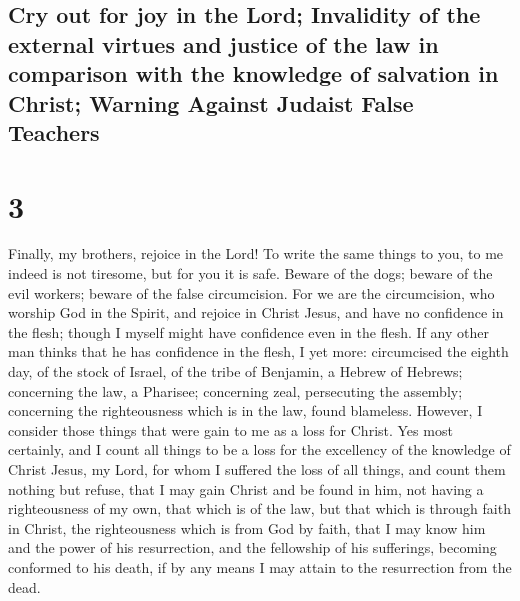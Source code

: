 \hypertarget{cry-out-for-joy-in-the-lord-invalidity-of-the-external-virtues-and-justice-of-the-law-in-comparison-with-the-knowledge-of-salvation-in-christ-warning-against-judaist-false-teachers}{%
\subsection{Cry out for joy in the Lord; Invalidity of the external
virtues and justice of the law in comparison with the knowledge of
salvation in Christ; Warning Against Judaist False
Teachers}\label{cry-out-for-joy-in-the-lord-invalidity-of-the-external-virtues-and-justice-of-the-law-in-comparison-with-the-knowledge-of-salvation-in-christ-warning-against-judaist-false-teachers}}

\hypertarget{section-2}{%
\section{3}\label{section-2}}

 Finally, my brothers, rejoice in the Lord! To write the
same things to you, to me indeed is not tiresome, but for you it is
safe.  Beware of the dogs; beware of the evil workers;
beware of the false circumcision.  For we are the
circumcision, who worship God in the Spirit, and rejoice in Christ
Jesus, and have no confidence in the flesh;  though I
myself might have confidence even in the flesh. If any other man thinks
that he has confidence in the flesh, I yet more: 
circumcised the eighth day, of the stock of Israel, of the tribe of
Benjamin, a Hebrew of Hebrews; concerning the law, a Pharisee;
 concerning zeal, persecuting the assembly; concerning the
righteousness which is in the law, found blameless. 
However, I consider those things that were gain to me as a loss for
Christ.  Yes most certainly, and I count all things to be
a loss for the excellency of the knowledge of Christ Jesus, my Lord, for
whom I suffered the loss of all things, and count them nothing but
refuse, that I may gain Christ  and be found in him, not
having a righteousness of my own, that which is of the law, but that
which is through faith in Christ, the righteousness which is from God by
faith,  that I may know him and the power of his
resurrection, and the fellowship of his sufferings, becoming conformed
to his death,  if by any means I may attain to the
resurrection from the dead.

